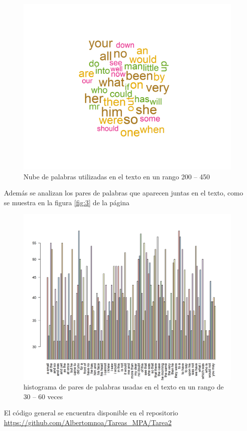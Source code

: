 \documentclass{article}
\begin{document}
 \begin{center}
\begin{figure}
\includegraphics[scale=0.65]{figuras/nubedepalabras.png}
\caption{Nube de palabras utilizadas en el texto en un rango 200 -- 450}
\label{fig:4}
\end{figure}
\end{center}
 
 Además se analizan los pares de palabras que aparecen juntas en el texto, como se muestra en la figura \ref{fig:3} de la página \pageref{fig:3}

\begin{center}
\begin{figure}
\includegraphics[scale=0.7]{figuras/ngrams.png}
\caption{histograma de pares de palabras usadas en el texto en un rango de 30 -- 60 veces}
\label{fig:5}
\end{figure}
\end{center}


El código general se encuentra disponible en el repositorio \href{https://github.com/Albertomnoa/Tareas_MPA/tree/master/Tarea2}{https://github.com/Albertomnoa/Tareas\_MPA/Tarea2} 

\newpage


\end{document}
